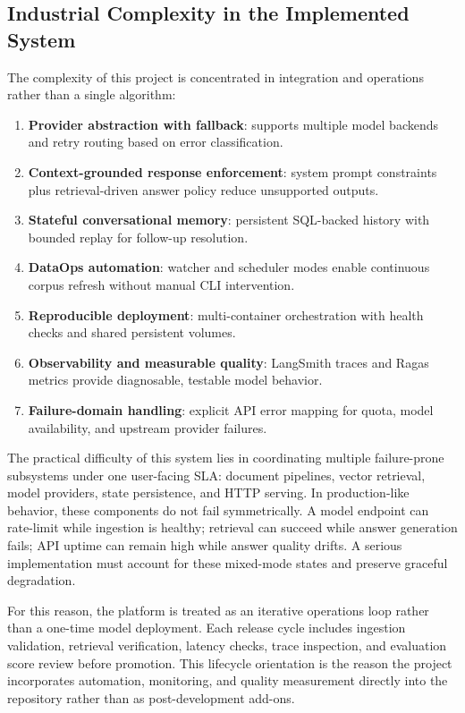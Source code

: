 \documentclass[12pt,letterpaper]{report}
\begin{document}
\subsection{Industrial Complexity in the Implemented System}
The complexity of this project is concentrated in integration and operations rather than a single algorithm:
\begin{enumerate}
\item \textbf{Provider abstraction with fallback}: supports multiple model backends and retry routing based on error classification.
\item \textbf{Context-grounded response enforcement}: system prompt constraints plus retrieval-driven answer policy reduce unsupported outputs.
\item \textbf{Stateful conversational memory}: persistent SQL-backed history with bounded replay for follow-up resolution.
\item \textbf{DataOps automation}: watcher and scheduler modes enable continuous corpus refresh without manual CLI intervention.
\item \textbf{Reproducible deployment}: multi-container orchestration with health checks and shared persistent volumes.
\item \textbf{Observability and measurable quality}: LangSmith traces and Ragas metrics provide diagnosable, testable model behavior.
\item \textbf{Failure-domain handling}: explicit API error mapping for quota, model availability, and upstream provider failures.
\end{enumerate}

The practical difficulty of this system lies in coordinating multiple failure-prone subsystems under one user-facing SLA: document pipelines, vector retrieval, model providers, state persistence, and HTTP serving. In production-like behavior, these components do not fail symmetrically. A model endpoint can rate-limit while ingestion is healthy; retrieval can succeed while answer generation fails; API uptime can remain high while answer quality drifts. A serious implementation must account for these mixed-mode states and preserve graceful degradation.

For this reason, the platform is treated as an iterative operations loop rather than a one-time model deployment. Each release cycle includes ingestion validation, retrieval verification, latency checks, trace inspection, and evaluation score review before promotion. This lifecycle orientation is the reason the project incorporates automation, monitoring, and quality measurement directly into the repository rather than as post-development add-ons.
\end{document}

